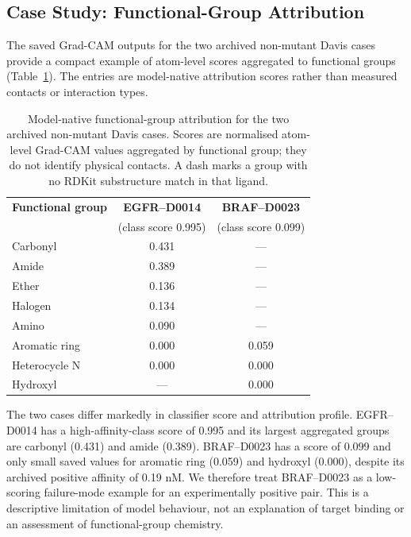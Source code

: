 \documentclass[fleqn,10pt]{wlscirep}
\begin{document}
\subsection{Case Study: Functional-Group Attribution}

The saved Grad-CAM outputs for the two archived non-mutant Davis cases provide a
compact example of atom-level scores aggregated to functional groups
(Table~\ref{tab:functional_group}).  The entries are model-native attribution
scores rather than measured contacts or interaction types.

\begingroup\color{red}
\begin{table}[htbp]
\centering
\caption{Model-native functional-group attribution for the two archived
  non-mutant Davis cases. Scores are normalised atom-level Grad-CAM values
  aggregated by functional group; they do not identify physical contacts. A
  dash marks a group with no RDKit substructure match in that ligand.}
\label{tab:functional_group}
\begin{tabular}{lcc}
\toprule
\textbf{Functional group} & \textbf{EGFR--D0014} & \textbf{BRAF--D0023} \\
 & (class score 0.995) & (class score 0.099) \\
\midrule
Carbonyl      & 0.431 & --- \\
Amide         & 0.389 & --- \\
Ether         & 0.136 & --- \\
Halogen       & 0.134 & --- \\
Amino         & 0.090 & --- \\
Aromatic ring & 0.000 & 0.059 \\
Heterocycle N & 0.000 & 0.000 \\
Hydroxyl      & ---   & 0.000 \\
\bottomrule
\end{tabular}
\end{table}
\endgroup

\FloatBarrier

The two cases differ markedly in classifier score and attribution profile.
EGFR--D0014 has a high-affinity-class score of 0.995 and its largest aggregated
groups are carbonyl (0.431) and amide (0.389).  BRAF--D0023 has a score of 0.099
and only small saved values for aromatic ring (0.059) and hydroxyl (0.000),
despite its archived positive affinity of 0.19 nM. We therefore treat
BRAF--D0023 as a low-scoring failure-mode example for an experimentally positive
pair. This is a descriptive limitation of model behaviour, not an explanation of
target binding or an assessment of functional-group chemistry.
\end{document}
